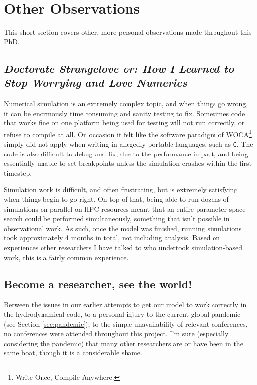 \section{Other Observations}

This short section covers other, more personal observations made throughout this PhD.

\subsection[\textit{How I Learned to Stop Worrying and Love Numerics}]{\textit{Doctorate Strangelove or: How I Learned to Stop Worrying and Love Numerics}}

Numerical simulation is an extremely complex topic, and when things go wrong, it can be enormously time consuming and sanity testing to fix.
Sometimes code that works fine on one platform being used for testing will not run correctly, or refuse to compile at all.
On occasion it felt like the software paradigm of WOCA\footnote{Write Once, Compile Anywhere.} simply did not apply when writing in allegedly portable languages, such as \texttt{C}.
The code is also difficult to debug and fix, due to the performance impact, and being essentially unable to set breakpoints unless the simulation crashes within the first timestep.

Simulation work is difficult, and often frustrating, but is extremely satisfying when things begin to go right.
On top of that, being able to run dozens of simulations on parallel on HPC resources meant that an entire parameter space search could be performed simultaneously, something that isn't possible in observational work.
As such, once the model was finished, running simulations took approximately 4 months in total, not including analysis.
Based on experiences other researchers I have talked to who undertook simulation-based work, this is a fairly common experience.

\subsection{Become a researcher, see the world!}

Between the issues in our earlier attempts to get our model to work correctly in the \mg{} hydrodynamical code, to a personal injury to the current global pandemic
(see Section \ref{sec:pandemic}), to the simple unavailability of relevant conferences, no conferences were attended throughout this project.
I'm sure (especially considering the pandemic) that many other researchers are or have been in the same boat, though it is a considerable shame.

